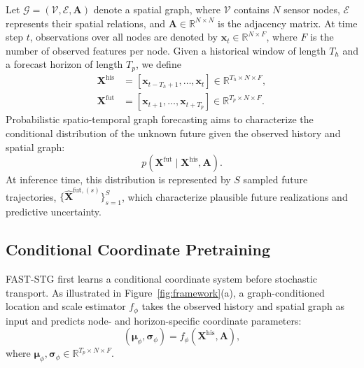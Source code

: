 \documentclass[sigconf, anonymous, review]{acmart}
\begin{document}
Let $\mathcal{G}=(\mathcal{V},\mathcal{E},\mathbf{A})$ denote a
spatial graph, where $\mathcal{V}$ contains $N$ sensor nodes,
$\mathcal{E}$ represents their spatial relations, and
$\mathbf{A}\in\mathbb{R}^{N\times N}$ is the adjacency matrix. At time
step $t$, observations over all nodes are denoted by
$\mathbf{x}_{t}\in\mathbb{R}^{N\times F}$, where $F$ is the number of
observed features per node. Given a historical window of length
$T_h$ and a forecast horizon of length $T_p$, we define
%
\begin{equation}
\begin{aligned}
\mathbf{X}^{\mathrm{his}}
&=
[\mathbf{x}_{t-T_h+1},\ldots,\mathbf{x}_{t}]
\in\mathbb{R}^{T_h\times N\times F},\\
\mathbf{X}^{\mathrm{fut}}
&=
[\mathbf{x}_{t+1},\ldots,\mathbf{x}_{t+T_p}]
\in\mathbb{R}^{T_p\times N\times F}.
\end{aligned}
\label{eq:history_future}
\end{equation}
%
Probabilistic spatio-temporal graph forecasting aims to characterize
the conditional distribution of the unknown future given the observed
history and spatial graph:
%
\begin{equation}
p\left(
\mathbf{X}^{\mathrm{fut}}
\mid
\mathbf{X}^{\mathrm{his}},\mathbf{A}
\right).
\label{eq:forecasting_distribution}
\end{equation}
%
At inference time, this distribution is represented by $S$ sampled
future trajectories,
$\{\widehat{\mathbf{X}}^{\mathrm{fut},(s)}\}_{s=1}^{S}$,
which characterize plausible future realizations and predictive
uncertainty.

\subsection{Conditional Coordinate Pretraining}
\label{sec:coordinate_pretraining}

FAST-STG first learns a conditional coordinate system before stochastic
transport. As illustrated in Figure~\ref{fig:framework}(a), a
graph-conditioned location and scale estimator $f_{\phi}$ takes the
observed history and spatial graph as input and predicts node- and
horizon-specific coordinate parameters:
%
\begin{equation}
\left(
\boldsymbol{\mu}_{\phi},
\boldsymbol{\sigma}_{\phi}
\right)
=
f_{\phi}
\left(
\mathbf{X}^{\mathrm{his}},
\mathbf{A}
\right),
\label{eq:coordinate_estimator}
\end{equation}
%
where
$\boldsymbol{\mu}_{\phi},
\boldsymbol{\sigma}_{\phi}
\in\mathbb{R}^{T_p\times N\times F}$.
\end{document}
